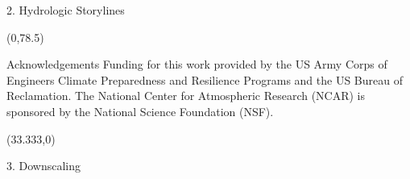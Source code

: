 \documentclass{beamer}
\begin{document}
\begin{frame}{}
\begin{columns}
\begin{column}{.3333\paperwidth}
\begin{textblock}{\textwidth \TPHorizModule}
\begin{block}{2. Hydrologic Storylines}
    \end{block}
   \end{textblock}

   \begin{textblock}{\textwidth \TPHorizModule}(0,78.5)
    \begin{block}{Acknowledgements}
     \vspace{-1cm}
     Funding for this work provided by the US Army Corps of Engineers Climate Preparedness and Resilience Programs and the US Bureau of Reclamation.  The National Center for Atmospheric Research (NCAR) is sponsored by the National Science Foundation (NSF).
    \end{block}
   \end{textblock}


   \begin{textblock}{\textwidth \TPHorizModule}(33.333,0)
    \begin{block}{3. Downscaling}
     \vspace{-0.5cm}

     \begin{itemize}
      \justifying


\end{itemize}
\end{block}
\end{textblock}
\end{column}
\end{columns}
\end{frame}
\end{document}
